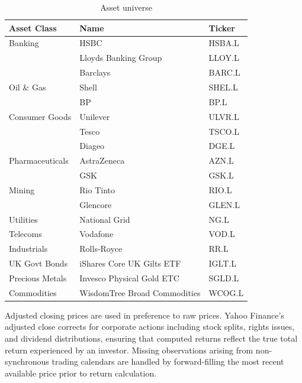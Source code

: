\documentclass[a4paper,alpha-refs]{scr-contemporary}
\numberwithin{equation}{section}
\begin{document}
\begin{table}[h]
\centering
\caption{Asset universe}
\begin{tabular}{l l l}
\toprule
\textbf{Asset Class} & \textbf{Name} & \textbf{Ticker} \\
\midrule
Banking         & HSBC                         & HSBA.L \\
                & Lloyds Banking Group         & LLOY.L \\
                & Barclays                     & BARC.L \\
Oil \& Gas      & Shell                        & SHEL.L \\
                & BP                           & BP.L   \\
Consumer Goods  & Unilever                     & ULVR.L \\
                & Tesco                        & TSCO.L \\
                & Diageo                       & DGE.L  \\
Pharmaceuticals & AstraZeneca                  & AZN.L  \\
                & GSK                          & GSK.L  \\
Mining          & Rio Tinto                    & RIO.L  \\
                & Glencore                     & GLEN.L \\
Utilities       & National Grid                & NG.L   \\
Telecoms        & Vodafone                     & VOD.L  \\
Industrials     & Rolls-Royce                  & RR.L   \\
\midrule
UK Govt Bonds   & iShares Core UK Gilts ETF    & IGLT.L \\
Precious Metals & Invesco Physical Gold ETC    & SGLD.L \\
Commodities     & WisdomTree Broad Commodities & WCOG.L \\
\bottomrule
\end{tabular}
\label{tab:assets}
\end{table}
\indent Adjusted closing prices are used in preference to raw prices. Yahoo
Finance's adjusted close corrects for corporate actions including stock splits,
rights issues, and dividend distributions, ensuring that computed returns reflect
the true total return experienced by an investor. Missing observations arising
from non-synchronous trading calendars are handled by forward-filling the most
recent available price prior to return calculation. \\
\end{document}
